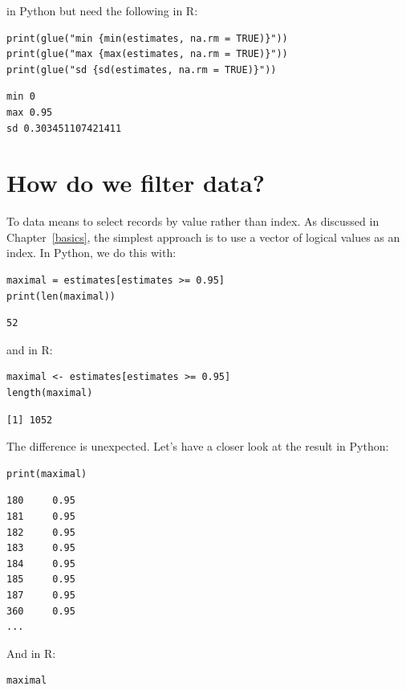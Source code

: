\noindent
in Python but need the following in R:

\begin{lstlisting}
print(glue("min {min(estimates, na.rm = TRUE)}"))
print(glue("max {max(estimates, na.rm = TRUE)}"))
print(glue("sd {sd(estimates, na.rm = TRUE)}"))
\end{lstlisting}

\begin{lstlisting}
min 0
max 0.95
sd 0.303451107421411
\end{lstlisting}

\section{How do we filter data?}

To  data means to select records by value rather than index.
As discussed in Chapter~\ref{basics},
the simplest approach is to use a vector of logical values as an index.
In Python, we do this with:

\begin{lstlisting}
maximal = estimates[estimates >= 0.95]
print(len(maximal))
\end{lstlisting}

\begin{lstlisting}
52
\end{lstlisting}

\noindent
and in R:

\begin{lstlisting}
maximal <- estimates[estimates >= 0.95]
length(maximal)
\end{lstlisting}

\begin{lstlisting}
[1] 1052
\end{lstlisting}

The difference is unexpected.
Let's have a closer look at the result in Python:

\begin{lstlisting}
print(maximal)
\end{lstlisting}

\begin{lstlisting}
180     0.95
181     0.95
182     0.95
183     0.95
184     0.95
185     0.95
187     0.95
360     0.95
...
\end{lstlisting}

And in R:

\begin{lstlisting}
maximal
\end{lstlisting}

